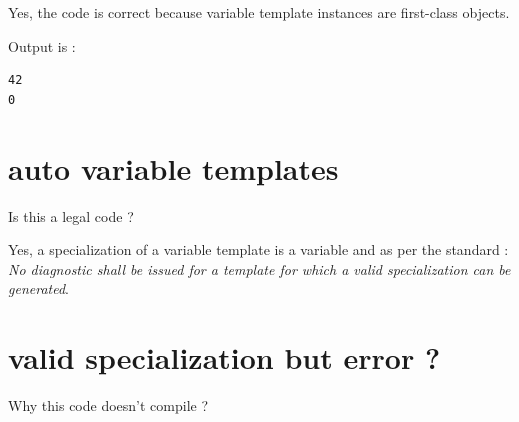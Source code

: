 \begin{Answer}[ref=ex09]

Yes, the code is correct because variable template instances are first-class objects.

Output is :
\begin{verbatim}
42
0
\end{verbatim}

\end{Answer}





\section{auto variable templates}

\begin{Exercise}[title={variable templates variables vary}, difficulty=2, label=ex010]

Is this a legal code ? 



\end{Exercise}


\begin{Answer}[ref=ex010]
Yes, a specialization of a variable template is a variable and as per the standard : \emph{No diagnostic shall be issued for a template for which a valid specialization can be generated}.

\end{Answer}





\section{valid specialization but error ?}

\begin{Exercise}[title={valid specialization but error}, difficulty=3, label=ex011]

Why this code doesn't compile ?



\end{Exercise}


